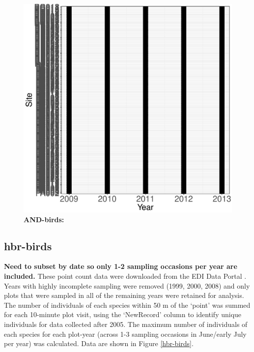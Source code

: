 \documentclass[11pt, oneside]{article}
\begin{document}
\begin{figure}[h!]
\includegraphics[scale = 0.4]{and-birds-wisnoski_spatiotemporal_sampling_effort.pdf}
\caption{{\bf AND-birds:} }
\label{and-birds}
\end{figure}


\subsection {hbr-birds}
{\bf Need to subset by date so only 1-2 sampling occasions per year are included.}
These point count data were downloaded from the EDI Data Portal \citep{hbr-birds}.
Years with highly incomplete sampling were removed (1999, 2000, 2008) and only plots that were sampled in all of the remaining years were retained for analysis.
The number of individuals of each species within 50 m of the `point' was summed for each 10-minute plot visit, using the `NewRecord' column to identify unique individuals for data collected after 2005. 
The maximum number of individuals of each species for each plot-year (across 1-3 sampling occasions in June/early July per year)  was calculated.
Data are shown in Figure \ref{hbr-birds}.
\end{document}
